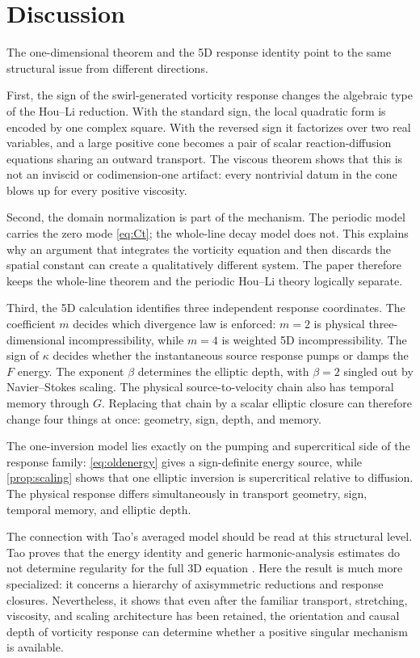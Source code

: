 \documentclass[11pt]{article}
\theoremstyle{definition}
\begin{document}
\section{Discussion}

The one-dimensional theorem and the 5D response identity point to the same structural issue from different directions.

First, the sign of the swirl-generated vorticity response changes the algebraic type of the Hou--Li reduction.  With the standard sign, the local quadratic form is encoded by one complex square.  With the reversed sign it factorizes over two real variables, and a large positive cone becomes a pair of scalar reaction-diffusion equations sharing an outward transport.  The viscous theorem shows that this is not an inviscid or codimension-one artifact: every nontrivial datum in the cone blows up for every positive viscosity.

Second, the domain normalization is part of the mechanism.  The periodic model carries the zero mode \eqref{eq:Ct}; the whole-line decay model does not.  This explains why an argument that integrates the vorticity equation and then discards the spatial constant can create a qualitatively different system.  The paper therefore keeps the whole-line theorem and the periodic Hou--Li theory logically separate.

Third, the 5D calculation identifies three independent response coordinates.  The coefficient $m$ decides which divergence law is enforced: $m=2$ is physical three-dimensional incompressibility, while $m=4$ is weighted 5D incompressibility.  The sign of $\kappa$ decides whether the instantaneous source response pumps or damps the $F$ energy.  The exponent $\beta$ determines the elliptic depth, with $\beta=2$ singled out by Navier--Stokes scaling.  The physical source-to-velocity chain also has temporal memory through $G$.  Replacing that chain by a scalar elliptic closure can therefore change four things at once: geometry, sign, depth, and memory.

The one-inversion model lies exactly on the pumping and supercritical side of the response family: \eqref{eq:oldenergy} gives a sign-definite energy source, while \cref{prop:scaling} shows that one elliptic inversion is supercritical relative to diffusion.  The physical response differs simultaneously in transport geometry, sign, temporal memory, and elliptic depth.

The connection with Tao's averaged model should be read at this structural level.  Tao proves that the energy identity and generic harmonic-analysis estimates do not determine regularity for the full 3D equation \cite{Tao2016}.  Here the result is much more specialized: it concerns a hierarchy of axisymmetric reductions and response closures.  Nevertheless, it shows that even after the familiar transport, stretching, viscosity, and scaling architecture has been retained, the orientation and causal depth of vorticity response can determine whether a positive singular mechanism is available.
\end{document}
